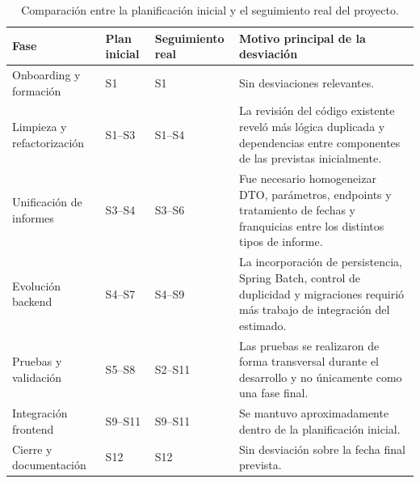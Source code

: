 \documentclass[11pt,a4paper,titlepage,oneside]{report}
\newcommand{\tfgtablestyle}{%
  \small
  \setlength{\tabcolsep}{4pt}%
  \renewcommand{\arraystretch}{1.15}%
  \rowcolors{2}{udcgray!08}{white}%
}
\begin{document}
\begin{table}[H]
  \centering
  \tfgtablestyle
  \caption{Comparación entre la planificación inicial y el seguimiento real del proyecto.}
  \label{tab:desviaciones-planificacion}

  \begin{tabularx}{0.97\textwidth}
    {@{}p{}p{}p{}X@{}}

    \toprule
    \rowcolor{udcpink!20}

    \textbf{Fase} &
    \textbf{Plan inicial} &
    \textbf{Seguimiento real} &
    \textbf{Motivo principal de la desviación} \\

    \midrule

    Onboarding y formación &
    S1 &
    S1 &
    Sin desviaciones relevantes. \\

    Limpieza y refactorización &
    S1--S3 &
    S1--S4 &
    La revisión del código existente reveló más lógica duplicada y
    dependencias entre componentes de las previstas inicialmente. \\

    Unificación de informes &
    S3--S4 &
    S3--S6 &
    Fue necesario homogeneizar DTO, parámetros, endpoints y tratamiento de
    fechas y franquicias entre los distintos tipos de informe. \\

    Evolución backend &
    S4--S7 &
    S4--S9 &
    La incorporación de persistencia, Spring Batch, control de duplicidad y
    migraciones requirió más trabajo de integración del estimado. \\

    Pruebas y validación &
    S5--S8 &
    S2--S11 &
    Las pruebas se realizaron de forma transversal durante el desarrollo y no
    únicamente como una fase final. \\

    Integración frontend &
    S9--S11 &
    S9--S11 &
    Se mantuvo aproximadamente dentro de la planificación inicial. \\

    Cierre y documentación &
    S12 &
    S12 &
    Sin desviación sobre la fecha final prevista. \\

    \bottomrule
  \end{tabularx}

\end{table}
\end{document}
